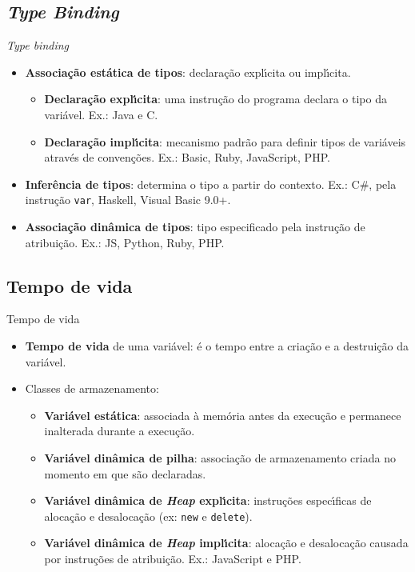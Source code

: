 \documentclass[handout,aspectratio=169]{beamer}
\newcommand{\bi}{\begin{itemize}[<+->]}
\newcommand{\ei}{\end{itemize}}
\begin{document}
\subsection{\it Type Binding}

\begin{frame}{\textit{Type binding}}

\begin{itemize}
\item \textbf{Associa\c{c}\~{a}o est\'{a}tica de tipos}: declara\c{c}\~{a}o expl\'{\i}cita ou impl\'{\i}cita.
\begin{itemize}
\item \textbf{Declara\c{c}\~{a}o expl\'{\i}cita}: uma instru\c{c}\~{a}o do programa declara o tipo da vari\'{a}vel. Ex.: Java e C.
\item \textbf{Declara\c{c}\~{a}o impl\'{\i}cita}: mecanismo padr\~{a}o para definir tipos de vari\'{a}veis atrav\'{e}s de conven\c{c}\~{o}es. Ex.: Basic, Ruby, JavaScript, PHP.
\end{itemize}
\item \textbf{Infer\^{e}ncia de tipos}: determina o tipo a partir do contexto. Ex.: C\#, pela instru\c{c}\~{a}o \texttt{var}, Haskell, Visual Basic 9.0+.
\item \textbf{Associa\c{c}\~{a}o din\^{a}mica de tipos}: tipo especificado pela instru\c{c}\~{a}o de atribui\c{c}\~{a}o. Ex.: JS, Python, Ruby, PHP.
\end{itemize}
\end{frame}



\subsection{Tempo de vida}

\begin{frame}{Tempo de vida}
	\bi
		\item\textbf{Tempo de vida} de uma vari\'{a}vel: \'{e} o tempo entre a cria\c{c}\~{a}o e a destrui\c{c}\~{a}o da vari\'{a}vel.
		\item Classes de armazenamento:
		\bi
			\item \textbf{Vari\'{a}vel est\'{a}tica}: associada à mem\'{o}ria antes da execu\c{c}\~{a}o e permanece inalterada durante a execu\c{c}\~{a}o.
			\item \textbf{Vari\'{a}vel din\^{a}mica de pilha}: associa\c{c}\~{a}o de armazenamento criada no momento em que s\~{a}o declaradas.
			\item \textbf{Vari\'{a}vel din\^{a}mica de \textit{Heap} expl\'{\i}cita}: instru\c{c}\~{o}es espec\'{\i}ficas de aloca\c{c}\~{a}o e desaloca\c{c}\~{a}o (ex: \texttt{new} e \texttt{delete}).
			\item \textbf{Vari\'{a}vel din\^{a}mica de \textit{Heap} impl\'{\i}cita}: aloca\c{c}\~{a}o e desaloca\c{c}\~{a}o causada por instru\c{c}\~{o}es de atribui\c{c}\~{a}o. Ex.: JavaScript e PHP.
		\ei
\ei
\end{frame}
\end{document}
